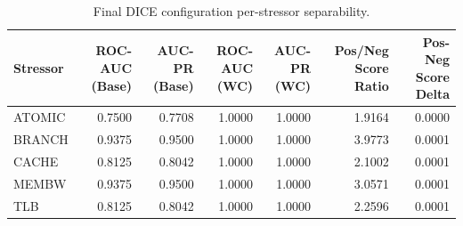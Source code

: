 \begin{table}[t]
\centering
\caption{Final DICE configuration per-stressor separability.}
\label{tab:dice_full_stressor}
\footnotesize
\begin{tabular}{lrrrrrr}
\toprule
Stressor & ROC-AUC (Base) & AUC-PR (Base) & ROC-AUC (WC) & AUC-PR (WC) & Pos/Neg Score Ratio & Pos-Neg Score Delta \\
\midrule
ATOMIC & 0.7500 & 0.7708 & 1.0000 & 1.0000 & 1.9164 & 0.0000 \\
BRANCH & 0.9375 & 0.9500 & 1.0000 & 1.0000 & 3.9773 & 0.0001 \\
CACHE & 0.8125 & 0.8042 & 1.0000 & 1.0000 & 2.1002 & 0.0001 \\
MEMBW & 0.9375 & 0.9500 & 1.0000 & 1.0000 & 3.0571 & 0.0001 \\
TLB & 0.8125 & 0.8042 & 1.0000 & 1.0000 & 2.2596 & 0.0001 \\
\bottomrule
\end{tabular}

\end{table}
